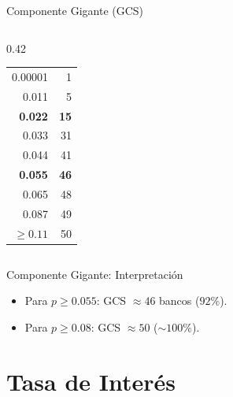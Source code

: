 \documentclass[aspectratio=169,10pt]{beamer}
\begin{document}
\begin{frame}{Componente Gigante (GCS)}
\begin{columns}[T]
\begin{column}{0.42\textwidth}
\begin{tabular}{rr}
        \midrule
        0.00001 & 1 \\
        0.011 & 5 \\
        \textbf{0.022} & \textbf{15} \\
        0.033 & 31 \\
        0.044 & 41 \\
        \textbf{0.055} & \textbf{46} \\
        0.065 & 48 \\
        0.087 & 49 \\
        $\geq 0.11$ & 50 \\
        \bottomrule
      \end{tabular}
    \end{column}
  \end{columns}
\end{frame}

\begin{frame}{Componente Gigante: Interpretación}
  \begin{itemize}
    \item Para $p \geq 0.055$: GCS $\approx 46$ bancos ($92\%$).
    \item Para $p \geq 0.08$: GCS $\approx 50$ ($\sim 100\%$).
  \end{itemize}
\end{frame}

\section{Tasa de Interés}
\end{document}
